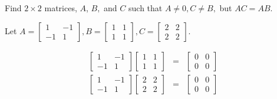 \documentclass{ximera}
\begin{document}
\begin{problem}\label{prb:4.16} Find $2\times 2$ matrices, $A$, $B,$ and $C$ such that $A\neq 0,C\neq B,$
but $AC=AB.$
\begin{hint}
Let $A = \left[
\begin{array}{rr}
1 & -1 \\
-1 & 1
\end{array}
\right], B = \left[
\begin{array}{cc}
1 & 1 \\
1 & 1
\end{array}
\right], C = \left[
\begin{array}{cc}
2 & 2 \\
2 & 2
\end{array}
\right]$.

\begin{eqnarray*}
\left[
\begin{array}{rr}
1 & -1 \\
-1 & 1
\end{array}
\right] \left[
\begin{array}{cc}
1 & 1 \\
1 & 1
\end{array}
\right]  &=& \left[
\begin{array}{cc}
0 & 0 \\
0 & 0
\end{array}
\right] \\
 \left[
\begin{array}{rr}
1 & -1 \\
-1 & 1
\end{array}
\right] \left[
\begin{array}{cc}
2 & 2 \\
2 & 2
\end{array}
\right] &=& \left[
\begin{array}{cc}
0 & 0 \\
0 & 0
\end{array}
\right]
\end{eqnarray*}
\end{hint}
\end{problem}
\end{document}
